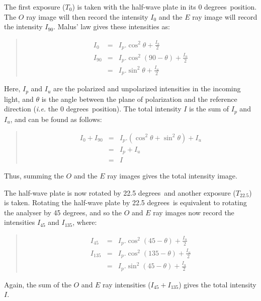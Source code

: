 \documentclass[twoside,11pt]{article}
\renewcommand{\_}{\texttt{\symbol{95}}}
\newenvironment{myquote}{\begin{quote}\begin{small}}{\end{small}\end{quote}}
\newcommand{\dgs}{\hbox{$^\circ$}}
\renewcommand{\dgs}{ degrees}
\begin{document}
The first exposure ($T_{0}$) is taken with the half-wave plate in its 0\dgs\
position. The $O$ ray image will then record the intensity $I_{0}$ and
the $E$ ray image will record the intensity $I_{90}$. Malus' law gives
these intensities as:

\begin{myquote}
\begin{eqnarray*}
  I_{0} & = & I_{p}.\cos^{2}\theta + \frac{I_{u}}{2} \\
 I_{90} & = & I_{p}.\cos^{2}(90 - \theta) + \frac{I_{u}}{2} \\
        & = & I_{p}.\sin^{2}\theta + \frac{I_{u}}{2}
\end{eqnarray*}
\end{myquote}

Here, $I_{p}$ and $I_{u}$ are the polarized and unpolarized intensities
in the incoming light, and $\theta$ is the angle between the plane of
polarization and the reference direction (\emph{i.e.} the 0\dgs\ position). The
total intensity $I$ is the sum of $I_{p}$ and $I_{u}$, and can be found
as follows:
\begin{myquote}
\begin{eqnarray*}
  I_{0} + I_{90} & = & I_{p}.(\cos^{2}\theta + \sin^{2}\theta) + I_{u} \\
                 & = & I_{p} + I_{u} \\
                 & = & I
\end{eqnarray*}
\end{myquote}

Thus, summing the $O$ and the $E$ ray images gives the total intensity
image. 

The half-wave plate is now rotated by 22.5\dgs\ and another exposure
($T_{22.5}$) is taken. Rotating the half-wave plate by 22.5\dgs\ is
equivalent to rotating the analyser by 45\dgs, and so the $O$ and $E$ ray
images now record the intensities $I_{45}$ and $I_{135}$, where:
\begin{myquote}
\begin{eqnarray*}
  I_{45} & = & I_{p}.\cos^{2}(45 - \theta) + \frac{I_{u}}{2} \\
 I_{135} & = & I_{p}.\cos^{2}(135 - \theta) + \frac{I_{u}}{2} \\
         & = & I_{p}.\sin^{2}(45 - \theta) + \frac{I_{u}}{2}
\end{eqnarray*}
\end{myquote}

Again, the sum of the $O$ and $E$ ray intensities ($I_{45}+I_{135}$)
gives the total intensity $I$. 
\end{document}
